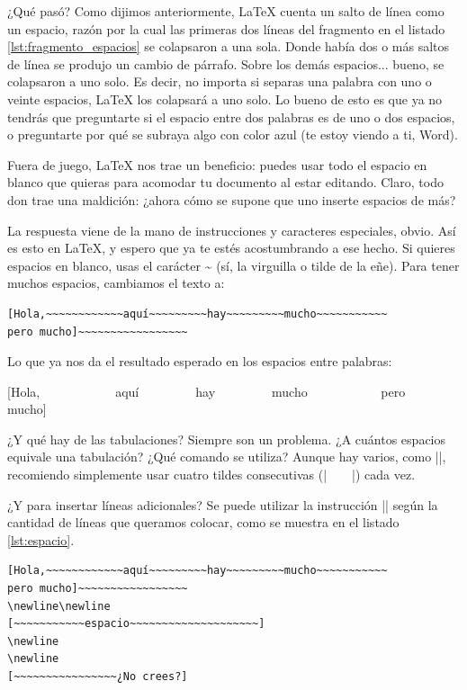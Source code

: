 ¿Qué pasó? Como dijimos anteriormente, \LaTeX{} cuenta un salto de línea como un espacio, razón por la cual las primeras dos líneas del fragmento en el listado \ref{lst:fragmento_espacios} se colapsaron a una sola. Donde había dos o más saltos de línea se produjo un cambio de párrafo. Sobre los demás espacios... bueno, se colapsaron a uno solo. Es decir, no importa si separas una palabra con uno o veinte espacios, \LaTeX{} los colapsará a uno solo. Lo bueno de esto es que ya no tendrás que preguntarte si el espacio entre dos palabras es de uno o dos espacios, o preguntarte por qué se subraya algo con color azul (te estoy viendo a ti, Word).

Fuera de juego, \LaTeX{} nos trae un beneficio: puedes usar todo el espacio en blanco que quieras para acomodar tu documento al estar editando. Claro, todo don trae una maldición: ¿ahora cómo se supone que uno inserte espacios de más?

La respuesta viene de la mano de instrucciones y caracteres especiales, obvio. Así es esto en \LaTeX{}, y espero que ya te estés acostumbrando a ese hecho. Si quieres espacios en blanco, usas el carácter \textbf{\textasciitilde} (sí, la virguilla o tilde de la eñe). Para tener muchos espacios, cambiamos el texto a:

\begin{lstlisting}[style=latex,numbers=none]
[Hola,~~~~~~~~~~~~aquí~~~~~~~~~hay~~~~~~~~~mucho~~~~~~~~~~~
pero mucho]~~~~~~~~~~~~~~~~~
\end{lstlisting}

\noindent Lo que ya nos da el resultado esperado en los espacios entre palabras:

\begin{displayquote}{}
[Hola,~~~~~~~~~~~~aquí~~~~~~~~~hay~~~~~~~~~mucho~~~~~~~~~~~
pero mucho]~~~~~~~~~~~~~~~~~
\end{displayquote}

¿Y qué hay de las tabulaciones? Siempre son un problema. ¿A cuántos espacios equivale una tabulación? ¿Qué comando se utiliza? Aunque hay varios, como |\quad|, recomiendo simplemente usar cuatro tildes consecutivas (|~~~~|) cada vez.

¿Y para insertar líneas adicionales? Se puede utilizar la instrucción |\newline| según la cantidad de líneas que queramos colocar, como se muestra en el listado \ref{lst:espacio}.

\begin{lstlisting}[style=latex,label=lst:espacio,caption={Espacio en blanco en \LaTeX{}.}]
[Hola,~~~~~~~~~~~~aquí~~~~~~~~~hay~~~~~~~~~mucho~~~~~~~~~~~
pero mucho]~~~~~~~~~~~~~~~~~
\newline\newline
[~~~~~~~~~~~espacio~~~~~~~~~~~~~~~~~~~~]
\newline
\newline
[~~~~~~~~~~~~~~~~¿No crees?]
\end{lstlisting}

